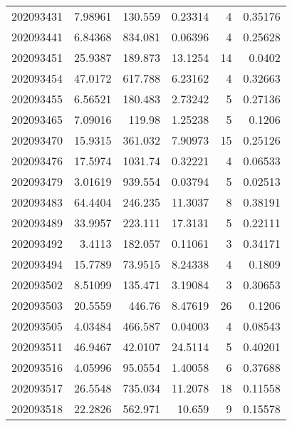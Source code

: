\begin{tabular}{rrrrrr}
 202093431 &          7.98961 &      130.559  &            0.23314 &           4 & 0.35176 \\
 202093441 &          6.84368 &      834.081  &            0.06396 &           4 & 0.25628 \\
 202093451 &         25.9387  &      189.873  &           13.1254  &          14 & 0.0402  \\
 202093454 &         47.0172  &      617.788  &            6.23162 &           4 & 0.32663 \\
 202093455 &          6.56521 &      180.483  &            2.73242 &           5 & 0.27136 \\
 202093465 &          7.09016 &      119.98   &            1.25238 &           5 & 0.1206  \\
 202093470 &         15.9315  &      361.032  &            7.90973 &          15 & 0.25126 \\
 202093476 &         17.5974  &     1031.74   &            0.32221 &           4 & 0.06533 \\
 202093479 &          3.01619 &      939.554  &            0.03794 &           5 & 0.02513 \\
 202093483 &         64.4404  &      246.235  &           11.3037  &           8 & 0.38191 \\
 202093489 &         33.9957  &      223.111  &           17.3131  &           5 & 0.22111 \\
 202093492 &          3.4113  &      182.057  &            0.11061 &           3 & 0.34171 \\
 202093494 &         15.7789  &       73.9515 &            8.24338 &           4 & 0.1809  \\
 202093502 &          8.51099 &      135.471  &            3.19084 &           3 & 0.30653 \\
 202093503 &         20.5559  &      446.76   &            8.47619 &          26 & 0.1206  \\
 202093505 &          4.03484 &      466.587  &            0.04003 &           4 & 0.08543 \\
 202093511 &         46.9467  &       42.0107 &           24.5114  &           5 & 0.40201 \\
 202093516 &          4.05996 &       95.0554 &            1.40058 &           6 & 0.37688 \\
 202093517 &         26.5548  &      735.034  &           11.2078  &          18 & 0.11558 \\
 202093518 &         22.2826  &      562.971  &           10.659   &           9 & 0.15578 \\

\end{tabular}
